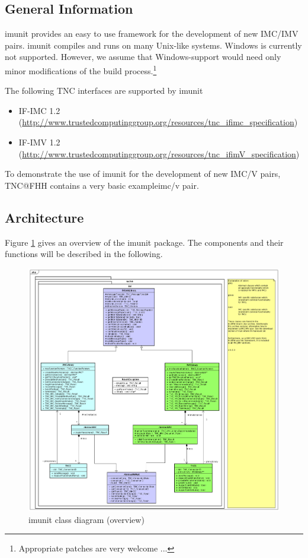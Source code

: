 \documentclass[a4paper,10pt]{scrartcl}
\begin{document}
\subsection{General Information}
imunit provides an easy to use framework for the development of new IMC/IMV
pairs. imunit compiles and runs on many Unix-like systems. Windows is currently
not supported. However, we assume that Windows-support would need only minor
modifications of the build process.\footnote{Appropriate patches are very
welcome ...}

The following TNC interfaces are supported by imunit
\begin{itemize}
 \item IF-IMC 1.2 (\url{http://www.trustedcomputinggroup.org/resources/tnc_ifimc_specification})
 \item IF-IMV 1.2 (\url{http://www.trustedcomputinggroup.org/resources/tnc_ifimV_specification})
\end{itemize}

To demonstrate the use of imunit for the development of new IMC/V pairs, TNC@FHH
contains a very basic exampleimc/v pair.

\subsection{Architecture}
Figure \ref{fig:imunit-overview} gives an overview of the imunit package. The components and
their functions will be described in the following.
\begin{figure}
 \centering
 \includegraphics[width=\textwidth]{design/tncfhh-class-sequence-diagrams-0-6-0/iml-class-0-6-0-light.png}
 \caption{imunit class diagram (overview)}
 \label{fig:imunit-overview}
\end{figure}
\end{document}
